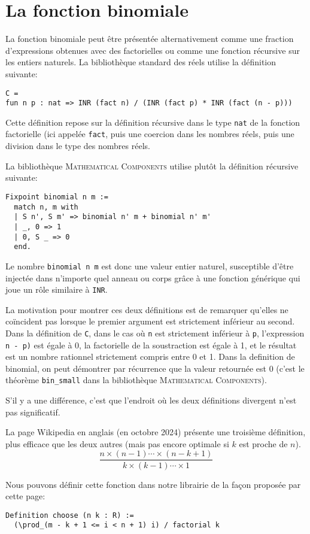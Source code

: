 \documentclass{modjflart}
\newcommand{\mathcomp}{\textsc{Mathematical Components}}
\begin{document}
\section{La fonction binomiale}
La fonction binomiale peut être présentée alternativement comme une fraction
d'expressions obtenues avec des factorielles ou comme une
fonction récursive sur les entiers naturels.  La bibliothèque
standard des réels utilise la définition suivante:
\begin{verbatim}
C =
fun n p : nat => INR (fact n) / (INR (fact p) * INR (fact (n - p)))
\end{verbatim}
Cette définition repose sur la définition récursive dans le type 
\texttt{nat} de la fonction factorielle (ici appelée \texttt{fact}, puis
une coercion dans les nombres réels, puis une division dans le type
des nombres réels.

La bibliothèque \mathcomp{} utilise plutôt la définition récursive suivante:
\begin{verbatim}
Fixpoint binomial n m :=
  match n, m with
  | S n', S m' => binomial n' m + binomial n' m'
  | _, 0 => 1
  | 0, S _ => 0
  end.
\end{verbatim}
Le nombre \texttt{binomial n m} est donc une valeur entier naturel, susceptible
d'être injectée dans n'importe quel anneau ou corps grâce à une
fonction générique qui joue un rôle similaire à \texttt{INR}.

La motivation pour montrer ces deux définitions est de remarquer
qu'elles ne coïncident pas lorsque le premier argument est strictement
inférieur au second.   Dans la définition de \texttt{C},  dans le cas où
\texttt{n}  est strictement inférieur à \texttt{p}, l'expression \texttt{n -
  p)} est égale à 0, la
factorielle de la soustraction est égale à 1, et le résultat est un
nombre rationnel strictement compris entre 0 et 1.  Dans la definition
de binomial, on peut démontrer par récurrence que la valeur retournée
est 0 (c'est le théorème \texttt{bin\_small} dans la bibliothèque
\mathcomp{}).

S'il y a une différence, c'est que l'endroit où les deux définitions
divergent n'est pas significatif.

La page Wikipedia en anglais (en octobre 2024) présente une troisième
définition, plus
efficace que les deux autres (mais pas encore optimale si \(k\) est proche
de \(n\)).
\[\frac{n \times (n - 1) \cdots \times (n - k + 1)}
{k \times (k - 1) \cdots \times 1}\]

Nous pouvons définir cette fonction dans notre librairie de la façon
proposée par cette page:
\begin{verbatim}
Definition choose (n k : R) :=
  (\prod_(m - k + 1 <= i < n + 1) i) / factorial k
\end{verbatim}
\end{document}
